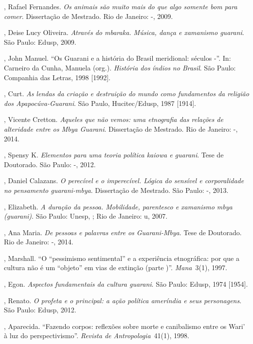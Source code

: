 {{\begin{Parskip}
 , Rafael Fernandes. \emph{Os animais são muito mais do que algo
somente bom para comer}. Dissertação de Mestrado. Rio de Janeiro:
-, 2009.

, Deise Lucy Oliveira. \emph{Através do mbaraka. Música, dança e
xamanismo guarani}. São Paulo: Edusp, 2009.

, John Manuel. ``Os Guarani e a história do Brasil meridional:
séculos -''. In: Carneiro da Cunha, Manuela (org.). \emph{História dos
índios no Brasil}. São Paulo: Companhia das Letras, 1998 [1992].

, Curt. \emph{As lendas da criação e destruição do mundo como
fundamentos da religião dos Apapocúva-Guarani}. São Paulo,
Hucitec/Edusp, 1987 [1914].

, Vicente Cretton. \emph{Aqueles que não vemos: uma etnografia das
relações de alteridade entre os Mbya Guarani}. Dissertação de Mestrado.
Rio de Janeiro: -, 2014.

, Spensy K. \emph{Elementos para uma teoria política kaiowa e guarani}.
Tese de Doutorado. São Paulo: -, 2012.

, Daniel Calazans. \emph{O perecível e o imperecível. Lógica do sensível
e corporalidade no pensamento guarani-mbya}. Dissertação de Mestrado.
São Paulo: -, 2013.

, Elizabeth. \emph{A duração da pessoa. Mobilidade, parentesco e
xamanismo mbya (guarani)}. São Paulo: Unesp, ; Rio de Janeiro: u,
2007.

  , Ana Maria. \emph{De pessoas e palavras entre os Guarani-Mbya}.
Tese de Doutorado. Rio de Janeiro: -, 2014.

, Marshall. ``O ``pessimismo sentimental'' e a experiência
etnográfica: por que a cultura não é um ``objeto'' em vias de extinção
(parte )''. \emph{Mana~}3(1), 1997.

, Egon. \emph{Aspectos fundamentais da cultura guarani}. São Paulo:
Edusp, 1974 [1954].

, Renato. \emph{O profeta e o principal: a ação política ameríndia e
seus personagens}. São Paulo: Edusp, 2012.

, Aparecida. ``Fazendo corpos: reflexões sobre morte e canibalismo
entre os Wari’ à luz do perspectivismo''. \emph{Revista de Antropologia}~41(1),
1998.


\end{Parskip}}}
